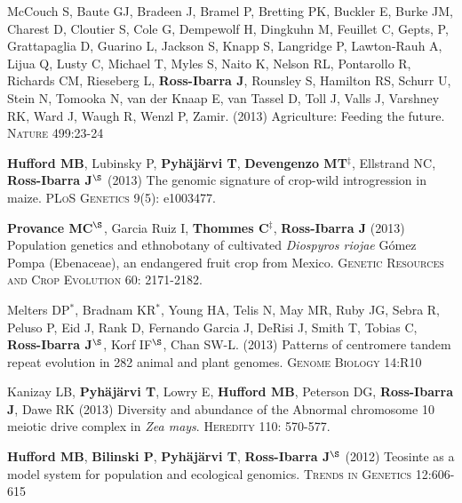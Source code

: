 \documentclass[letterpaper,10pt]{article}
\begin{document}
\begin{etaremune}
\item McCouch S, Baute GJ, Bradeen J, Bramel P, Bretting PK, Buckler E, Burke JM, Charest D, Cloutier S, Cole G, Dempewolf H, Dingkuhn M, Feuillet C, Gepts, P, Grattapaglia D, Guarino L, Jackson S, Knapp S, Langridge P, Lawton-Rauh A, Lijua Q, Lusty C, Michael T, Myles S, Naito K, Nelson RL, Pontarollo R, Richards CM, Rieseberg L, {\bf Ross-Ibarra J}, Rounsley S, Hamilton RS, Schurr U, Stein N, Tomooka N, van der Knaap E, van Tassel D, Toll J, Valls J, Varshney RK, Ward J, Waugh R, Wenzl P, Zamir. (2013) Agriculture: Feeding the future. \textsc{Nature} 499:23-24


\item {\bf Hufford MB}, Lubinsky P, {\bf Pyh\"aj\"arvi T}, {\bf Devengenzo MT}$^\ddagger$, Ellstrand NC, {\bf Ross-Ibarra J}$^\S$ (2013) The genomic signature of crop-wild introgression in maize. \textsc{PLoS Genetics} 9(5): e1003477. %


\item {\bf Provance MC}$^\S$, Garcia Ruiz I, {\bf Thommes C}$^\ddagger$, {\bf Ross-Ibarra J} (2013) Population genetics and ethnobotany of cultivated \emph{Diospyros riojae} G\'omez Pompa (Ebenaceae), an endangered fruit crop from Mexico. \textsc{Genetic Resources and Crop Evolution} 60: 2171-2182.


\item Melters DP$^*$, Bradnam KR$^*$, Young HA, Telis N, May MR, Ruby JG, Sebra R, Peluso P, Eid J, Rank D, Fernando Garcia J, DeRisi J, Smith T, Tobias C, {\bf Ross-Ibarra J}$^\S$, Korf IF$^\S$, Chan SW-L. (2013) Patterns of centromere tandem repeat evolution in 282 animal and plant genomes. \textsc{Genome Biology} 14:R10


\item Kanizay LB, {\bf Pyh\"aj\"arvi T}, Lowry E, {\bf Hufford MB}, Peterson DG, {\bf Ross-Ibarra J}, Dawe RK (2013) Diversity and abundance of the Abnormal chromosome 10 meiotic drive complex in \emph{Zea mays}. \textsc{Heredity} 110: 570-577.


\item {\bf Hufford MB}, {\bf Bilinski P}, {\bf Pyh\"aj\"arvi T}, {\bf Ross-Ibarra J}$^\S$ (2012) Teosinte as a model system for population and ecological genomics. \textsc{Trends in Genetics} 12:606-615 %



\end{etaremune}
\end{document}
